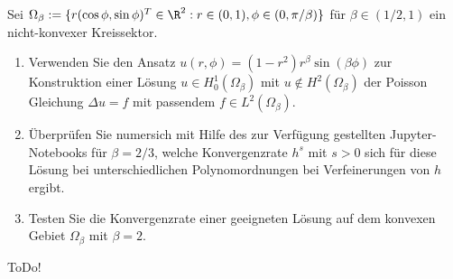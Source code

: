 
\begin{exercise}

Sei $\Omega_\beta := \{r(\cos \phi, \sin \phi)^T \in \R^2: r \in (0,1), \phi \in (0, \pi / \beta)\}$
für $\beta \in (1/2,1)$ ein nicht-konvexer Kreissektor.
\begin{enumerate}[label = \textbf{(\alph*)}]
  \item Verwenden Sie den Ansatz $u(r,\phi) = (1-r^2)r^\beta \sin(\beta \phi)$ zur Konstruktion
  einer Lösung $u \in H^1_0(\Omega_\beta)$ mit $u \notin H^2(\Omega_\beta)$ der Poisson Gleichung
  $\Delta u = f$ mit passendem $f \in L^2(\Omega_\beta)$.
  \item Überprüfen Sie numersich mit Hilfe des zur Verfügung gestellten Jupyter-Notebooks für
  $\beta = 2/3$, welche Konvergenzrate $h^s$ mit $s > 0$ sich für diese Lösung bei unterschiedlichen
  Polynomordnungen bei Verfeinerungen von $h$ ergibt.
  \item Testen Sie die Konvergenzrate einer geeigneten Lösung auf dem konvexen Gebiet $\Omega_\beta$ mit $\beta = 2$.
\end{enumerate}

\end{exercise}


\begin{solution}

ToDo!

\end{solution}

